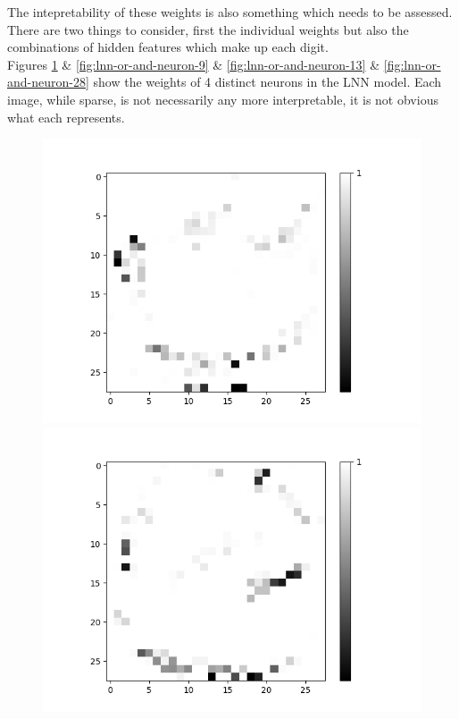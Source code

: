 The intepretability of these weights is also something which needs to be assessed. There are two things to consider, first the individual weights but also the combinations of hidden features which make up each digit.\\

Figures \ref{fig:lnn-or-and-neuron-0} \& \ref{fig:lnn-or-and-neuron-9} \& \ref{fig:lnn-or-and-neuron-13} \& \ref{fig:lnn-or-and-neuron-28} show the weights of 4 distinct neurons in the LNN model. Each image, while sparse, is not necessarily any more interpretable, it is not obvious what each represents.

\begin{figure}[H]
	\centering
	\begin{minipage}[b]{0.45\textwidth}
		\includegraphics[width=\textwidth]{LNN-OR-AND/Neuron-0.png}
		\caption{}
		\label{fig:lnn-or-and-neuron-0}
	\end{minipage}
	\begin{minipage}[b]{0.45\textwidth}
		\includegraphics[width=\textwidth]{LNN-OR-AND/Neuron-9.png}

\end{minipage}
\end{figure}
